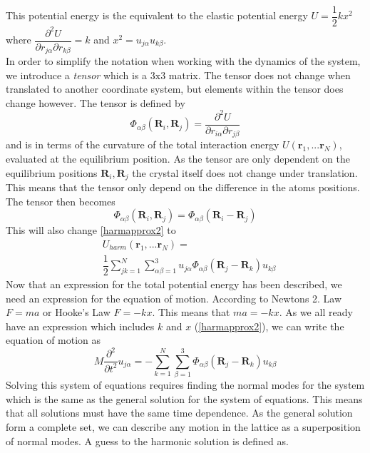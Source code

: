 This potential energy is the equivalent to the elastic potential energy $U=\dfrac{1}{2}kx^{2}$ where $\dfrac{\partial^{2} U}{\partial r_{j\alpha}\partial r_{k\beta}}=k$ and $x^{2}=u_{j\alpha}u_{k\beta}$.\\
In order to simplify the notation when working with the dynamics of the system, we introduce a \textit{tensor} which is a $3\text{x}3$ matrix. The tensor does not change when translated to another coordinate system, but elements within the tensor does change however. The tensor is defined by
\begin{equation}
    \Phi_{\alpha\beta}(\mathbf{R}_{i},\mathbf{R}_{j})=\dfrac{\partial^{2}U}{\partial r_{i\alpha}\partial r_{j\beta}}\label{tensor}
\end{equation}
and is in terms of the curvature of the total interaction energy $U(\mathbf{r}_{1},...\mathbf{r}_{N})$, evaluated at the equilibrium position. As the tensor are only dependent on the equilibrium positions $\mathbf{R}_{i},\mathbf{R}_{j}$ the crystal itself does not change under translation. This means that the tensor only depend on the difference in the atoms positions. The tensor then becomes
\begin{equation}
\Phi_{\alpha\beta}(\mathbf{R}_{i},\mathbf{R}_{j})=\Phi_{\alpha\beta}(\mathbf{R}_{i}-\mathbf{R}_{j})
\end{equation}
This will also change \cref{harmapprox2} to
\begin{align}
    &U_{harm}(\mathbf{r}_{1},...\mathbf{r}_{N})=\nonumber\\
    &\dfrac{1}{2}\sum_{jk=1}^{N}\sum_{\alpha\beta=1}^{3}u_{j\alpha}\Phi_{\alpha\beta}(\mathbf{R}_{j}-\mathbf{R}_{k})u_{k\beta}
\end{align}
Now that an expression for the total potential energy has been described, we need an expression for the equation of motion. According to Newtons 2. Law $F=ma$ or Hooke's Law $F=-kx$. This means that $ma=-kx$. As we all ready have an expression which includes $k$ and $x$ (\cref{harmapprox2}), we can write the equation of motion as 
\begin{equation}
    M\dfrac{\partial^{2}}{\partial
    t^{2}}u_{j\alpha}=-\sum_{k=1}^{N}\sum_{\beta=1}^{3}\Phi_{\alpha\beta}(\mathbf{R}_{j}-\mathbf{R}_{k})u_{k\beta}\label{Eqmotion}
\end{equation}
Solving this system of equations requires finding the normal modes for the system which is the same as the general solution for the system of equations. This means that all solutions must have the same time dependence. As the general solution form a complete set, we can describe any motion in the lattice as a superposition of normal modes. A guess to the harmonic solution is defined as.
